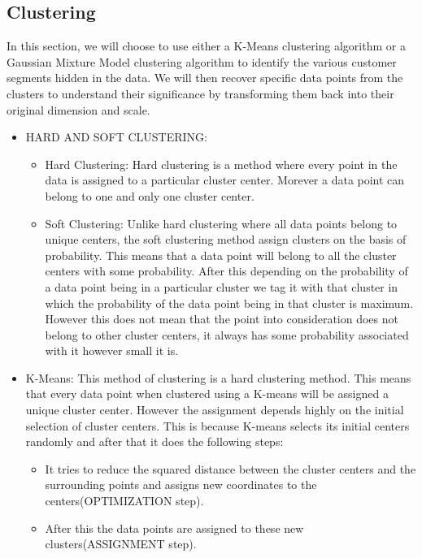 \documentclass[11pt]{article}
\providecommand{\tightlist}{%
      \setlength{\itemsep}{0pt}\setlength{\parskip}{0pt}}
\begin{document}
    \subsection{Clustering}\label{clustering}

In this section, we will choose to use either a K-Means clustering
algorithm or a Gaussian Mixture Model clustering algorithm to identify
the various customer segments hidden in the data. We will then recover
specific data points from the clusters to understand their significance
by transforming them back into their original dimension and scale.

    \begin{itemize}
\tightlist
\item
  HARD AND SOFT CLUSTERING:

  \begin{itemize}
  \tightlist
  \item
    Hard Clustering: Hard clustering is a method where every point in
    the data is assigned to a particular cluster center. Morever a data
    point can belong to one and only one cluster center.
  \item
    Soft Clustering: Unlike hard clustering where all data points belong
    to unique centers, the soft clustering method assign clusters on the
    basis of probability. This means that a data point will belong to
    all the cluster centers with some probability. After this depending
    on the probability of a data point being in a particular cluster we
    tag it with that cluster in which the probability of the data point
    being in that cluster is maximum. However this does not mean that
    the point into consideration does not belong to other cluster
    centers, it always has some probability associated with it however
    small it is.
  \end{itemize}
\item
  K-Means: This method of clustering is a hard clustering method. This
  means that every data point when clustered using a K-means will be
  assigned a unique cluster center. However the assignment depends
  highly on the initial selection of cluster centers. This is because
  K-means selects its initial centers randomly and after that it does
  the following steps:

  \begin{itemize}
  \tightlist
  \item
    It tries to reduce the squared distance between the cluster centers
    and the surrounding points and assigns new coordinates to the
    centers(OPTIMIZATION step).
  \item
    After this the data points are assigned to these new
    clusters(ASSIGNMENT step).
  \end{itemize}
\end{itemize}
\end{document}
